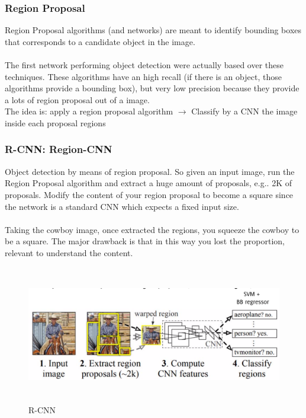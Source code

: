 \subsubsection{Region Proposal}
Region Proposal algorithms (and networks) are meant to identify bounding boxes that corresponds to a candidate object in the image.\\ \\
The first network performing object detection were actually based over these techniques. These algorithms have an high recall (if there is an object, those algorithms provide a bounding box), but very low precision because they provide a lots of region proposal out of a image.\\
The idea is: apply a region proposal algorithm $\rightarrow$ Classify by a CNN the image inside each proposal regions

\subsubsection{R-CNN: Region-CNN}
Object detection by means of region proposal. So given an input image, run the Region Proposal algorithm and extract a huge amount of proposals, e.g.. 2K of proposals. Modify the content of your region proposal to become a square since  the network is a standard CNN which expects a fixed input size. \\ \\
Taking the cowboy image, once extracted the regions, you squeeze the cowboy to be a square. The major drawback is that in this way you lost the proportion, relevant to understand the content. \\

 \begin{figure}[h]
    \centering
    \includegraphics[width=15cm, height=6cm]{images/r_cnn.png}
    \caption{R-CNN}
    \label{fig:r-cnn}
\end{figure}


